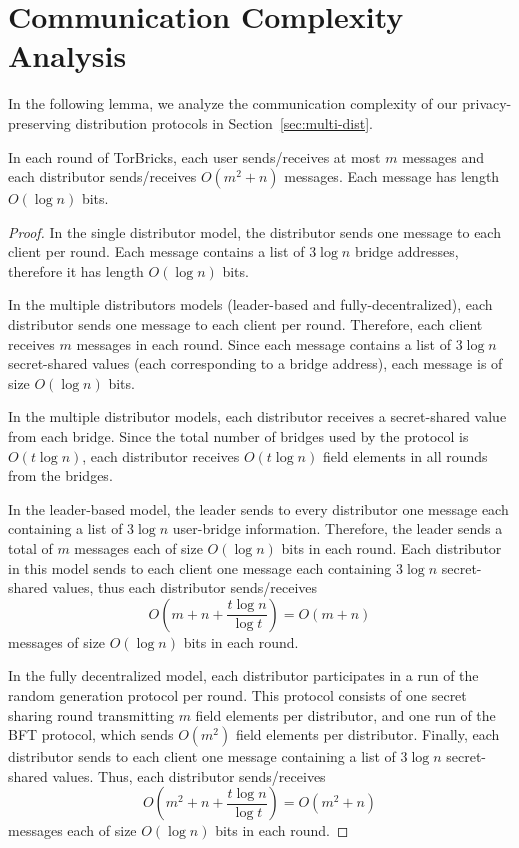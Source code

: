 \documentclass[a4paper,UKenglish]{lipics-v2016}
\newcommand{\bricks}{}
\def\bricks/{\mbox{TorBricks}}
\newcommand{\sfsize}{\fontsize{0.68\baselineskip}{0.68\baselineskip}\selectfont}
\newcommand{\sans}[1]{\textbf{\textsf{\sfsize \mbox{#1}}}}
\begin{document}
\section{Communication Complexity Analysis} \label{sec:commcomplex}
In the following lemma, we analyze the communication complexity of our privacy-preserving distribution protocols in Section~\ref{sec:multi-dist}.
\begin{lemma}[\sans{Communication Complexity}]
	In each round of \bricks/, each user sends/receives at most $m$ messages and each distributor sends/receives ${O(m^2 + n)}$ messages. Each message has length $O(\log{n})$ bits.
\end{lemma}
\begin{proof}
	In the single distributor model, the distributor sends one message to each client per round. Each message contains a list of $3\log{n}$ bridge addresses, therefore it has length $O(\log{n})$ bits.
	
	In the multiple distributors models (leader-based and fully-decentralized), each distributor sends one message to each client per round. Therefore, each client receives $m$ messages in each round. Since each message contains a list of $3\log{n}$ secret-shared values (each corresponding to a bridge address), each message is of size $O(\log{n})$ bits.
	
	In the multiple distributor models, each distributor receives a secret-shared value from each bridge. Since the total number of bridges used by the protocol is $O(t\log{n})$, each distributor receives $O(t\log{n})$ field elements in all rounds from the bridges.	
	
	In the leader-based model, the leader sends to every distributor one message each containing a list of $3\log{n}$ user-bridge information. Therefore, the leader sends a total of $m$ messages each of size $O(\log{n})$ bits in each round. Each distributor in this model sends to each client one message each containing $3\log{n}$ secret-shared values, thus each distributor sends/receives \[O\left(m + n + \frac{t\log{n}}{\log{t}}\right) = O(m + n)\] messages of size $O(\log{n})$ bits in each round.
	
	In the fully decentralized model, each distributor participates in a run of the random generation protocol per round. This protocol consists of one secret sharing round transmitting $m$ field elements per distributor, and one run of the BFT protocol, which sends $O(m^2)$ field elements per distributor. Finally, each distributor sends to each client one message containing a list of $3\log{n}$ secret-shared values. Thus, each distributor sends/receives \[O\left(m^2 + n + \frac{t\log{n}}{\log{t}}\right) = O(m^2 + n)\] messages each of size $O(\log{n})$ bits in each round.
	
\end{proof}
\end{document}
